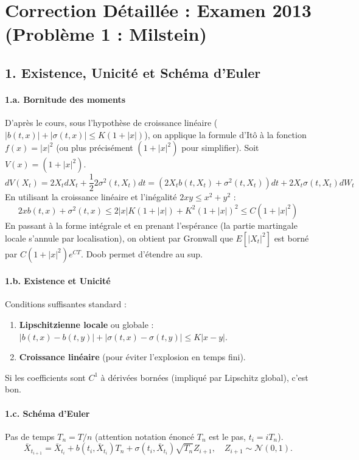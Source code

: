 \documentclass[a4paper,11pt]{article}
\begin{document}
\section{Correction Détaillée : Examen 2013 (Problème 1 : Milstein)}

\subsection{1. Existence, Unicité et Schéma d'Euler}

\paragraph{1.a. Bornitude des moments}
D'après le cours, sous l'hypothèse de croissance linéaire ($|b(t,x)| + |\sigma(t,x)| \le K(1+|x|)$), on applique la formule d'Itô à la fonction $f(x) = |x|^2$ (ou plus précisément $(1+|x|^2)$ pour simplifier).
Soit $V(x) = (1+|x|^2)$.
\[ dV(X_t) = 2X_t dX_t + \frac{1}{2} 2 \sigma^2(t,X_t) dt = (2X_t b(t,X_t) + \sigma^2(t,X_t)) dt + 2X_t \sigma(t,X_t) dW_t \]
En utilisant la croissance linéaire et l'inégalité $2xy \le x^2+y^2$ :
\[ 2x b(t,x) + \sigma^2(t,x) \le 2|x|K(1+|x|) + K^2(1+|x|)^2 \le C(1+|x|^2) \]
En passant à la forme intégrale et en prenant l'espérance (la partie martingale locale s'annule par localisation), on obtient par Gronwall que $E[|X_t|^2]$ est borné par $C(1+|x|^2)e^{CT}$. Doob permet d'étendre au sup.

\paragraph{1.b. Existence et Unicité}
Conditions suffisantes standard :
\begin{enumerate}
    \item \textbf{Lipschitzienne locale} ou globale : $|b(t,x)-b(t,y)| + |\sigma(t,x)-\sigma(t,y)| \le K|x-y|$.
    \item \textbf{Croissance linéaire} (pour éviter l'explosion en temps fini).
\end{enumerate}
Si les coefficients sont $C^1$ à dérivées bornées (impliqué par Lipschitz global), c'est bon.

\paragraph{1.c. Schéma d'Euler}
Pas de temps $T_n = T/n$ (attention notation énoncé $T_n$ est le pas, $t_i = i T_n$).
\[ \bar{X}_{t_{i+1}} = \bar{X}_{t_i} + b(t_i, \bar{X}_{t_i}) T_n + \sigma(t_i, \bar{X}_{t_i}) \sqrt{T_n} Z_{i+1}, \quad Z_{i+1} \sim \mathcal{N}(0,1). \]
\end{document}
